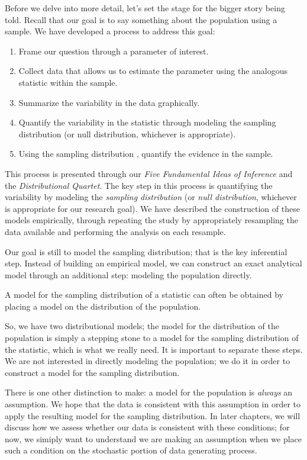 \documentclass[]{book}
\providecommand{\tightlist}{%
  \setlength{\itemsep}{0pt}\setlength{\parskip}{0pt}}
\theoremstyle{plain}
\theoremstyle{mydefn}
\theoremstyle{myexmpl}
\theoremstyle{remark}
\let\BeginKnitrBlock\begin \let\EndKnitrBlock\end
\let\BeginKnitrBlock\begin \let\EndKnitrBlock\end
\begin{document}
Before we delve into more detail, let's set the stage for the bigger
story being told. Recall that our goal is to say something about the
population using a sample. We have developed a process to address this
goal:

\begin{enumerate}
\def\labelenumi{\arabic{enumi}.}
\tightlist
\item
  Frame our question through a parameter of interest.
\item
  Collect data that allows us to estimate the parameter using the
  analogous statistic within the sample.
\item
  Summarize the variability in the data graphically.
\item
  Quantify the variability in the statistic through modeling the
  sampling distribution (or null distribution, whichever is
  appropriate).
\item
  Using the sampling distribution , quantify the evidence in the sample.
\end{enumerate}

This process is presented through our \emph{Five Fundamental Ideas of
Inference} and the \emph{Distributional Quartet}. The key step in this
process is quantifying the variability by modeling the \emph{sampling
distribution} (or \emph{null distribution}, whichever is appropriate for
our research goal). We have described the construction of these models
empirically, through repeating the study by appropriately resampling the
data available and performing the analysis on each resample.

Our goal is still to model the sampling distribution; that is the key
inferential step. Instead of building an empirical model, we can
construct an exact analytical model through an additional step: modeling
the population directly.

\BeginKnitrBlock{rmdkeyidea}
A model for the sampling distribution of a statistic can often be
obtained by placing a model on the distribution of the population.
\EndKnitrBlock{rmdkeyidea}

So, we have two distributional models; the model for the distribution of
the population is simply a stepping stone to a model for the sampling
distribution of the statistic, which is what we really need. It is
important to separate these steps. We are not interested in directly
modeling the population; we do it in order to construct a model for the
sampling distribution.

There is one other distinction to make: a model for the population is
\emph{always} an assumption. We hope that the data is consistent with
this assumption in order to apply the resulting model for the sampling
distribution. In later chapters, we will discuss how we assess whether
our data is consistent with these conditions; for now, we simiply want
to understand we are making an assumption when we place such a condition
on the stochastic portion of data generating process.
\end{document}
